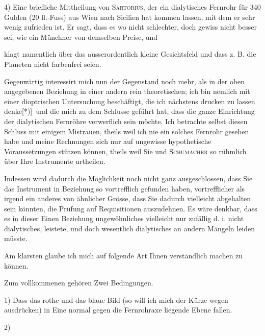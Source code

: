 4) Eine briefliche Mittheilung von \textsc{Sartorius}, der ein dialytisches Fernrohr für 340 Gulden (20 fl.-Fuss) aus Wien nach Sicilien hat kommen lassen, mit dem er sehr wenig zufrieden ist. Er sagt, dass es wo nicht schlechter, doch gewiss nicht besser sei, wie ein Münchner von demselben Preise, und
\par\HistoricalFoot{}{20\textsuperscript{*}}
\clearpage{}
\noindent klagt namentlich über das ausserordentlich kleine Gesichtsfeld und dass z. B. die Planeten nicht farbenfrei seien.

Gegenwärtig interessirt mich nun der Gegenstand noch mehr, als in der oben angegebenen Beziehung in einer andern rein theoretischen; ich bin nemlich mit einer dioptrischen Untersuchung beschäftigt, die ich nächstens drucken zu lassen denke[*)]\begingroup\renewcommand{\thefootnote}{}\endgroup\ und die mich zu dem Schlusse geführt hat, dass die ganze Einrichtung der dialytischen Fernröhre verwerflich sein möchte. Ich betrachte selbst diesen Schluss mit einigem Mistrauen, theils weil ich nie ein solches Fernrohr gesehen habe und meine Rechnungen sich nur auf ungewisse hypothetische Voraussetzungen stützen können, theils weil Sie und \textsc{Schumacher} so rühmlich über Ihre Instrumente urtheilen.

Indessen wird dadurch die Möglichkeit noch nicht ganz ausgeschlossen, dass Sie das Instrument in  Beziehung so vortrefflich gefunden haben, vortrefflicher als irgend ein anderes von ähnlicher Grösse, dass Sie dadurch vielleicht abgehalten sein könnten, die Prüfung auf  Requisitionen auszudehnen. Es wäre denkbar, dass es in dieser Einen Beziehung ungewöhnliches vielleicht nur zufällig d. i. nicht  dialytisches, leistete, und doch wesentlich  dialytisches an andern Mängeln leiden müsste.

Am klarsten glaube ich mich auf folgende Art Ihnen verständlich machen zu können.

Zum vollkommenen  gehören Zwei Bedingungen.

1) Dass das rothe und das blaue Bild (so will ich mich der Kürze wegen ausdrücken) in Eine normal gegen die Fernrohraxe liegende Ebene fallen.

2) 


